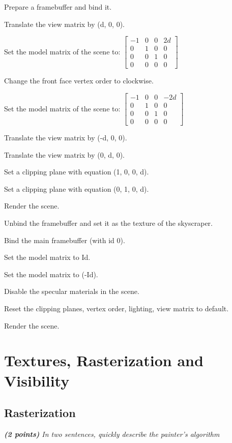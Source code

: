 \documentclass[a4paper,10pt]{article}
\newcommand{\cmark}{\ding{51}}%
\newcommand{\done}{\rlap{$\square$}{\raisebox{2pt}{\large\hspace{1pt}\cmark}}%
	\hspace{-2.5pt}}
\begin{document}
\begin{todolist}
	\item[\done] Prepare a framebuffer and bind it.
	\item Translate the view matrix by (d, 0, 0).
	\item Set the model matrix of the scene to: $\begin{bmatrix}
	-1 & 0 & 0 & 2d\\
	0 & 1 & 0 & 0\\
	0 & 0 & 1 & 0\\
	0 & 0 & 0 & 0
	\end{bmatrix}$
	\item[\done] Change the front face vertex order to clockwise.
	\item[\done] Set the model matrix of the scene to: $\begin{bmatrix}
	-1 & 0 & 0 & -2d\\
	0 & 1 & 0 & 0\\
	0 & 0 & 1 & 0\\
	0 & 0 & 0 & 0
	\end{bmatrix}$
	\item[\done] Translate the view matrix by (-d, 0, 0).
	\item Translate the view matrix by (0, d, 0).
	\item Set a clipping plane with equation (1, 0, 0, d).
	\item[\done] Set a clipping plane with equation (0, 1, 0, d).
	\item[\done] Render the scene.
	\item[\done] Unbind the framebuffer and set it as the texture of the skyscraper.
	\item[\done] Bind the main framebuffer (with id 0).
	\item[\done] Set the model matrix to Id.
	\item Set the model matrix to (-Id).
	\item[\done] Disable the specular materials in the scene.
	\item[\done] Reset the clipping planes, vertex order, lighting, view matrix to default. 
	\item[\done] Render the scene.
\end{todolist}

\section{Textures, Rasterization and Visibility}
\subsection{Rasterization}
\textit{\textbf{(2 points)} In two sentences, quickly describe the painter's algorithm}\\
\end{document}

